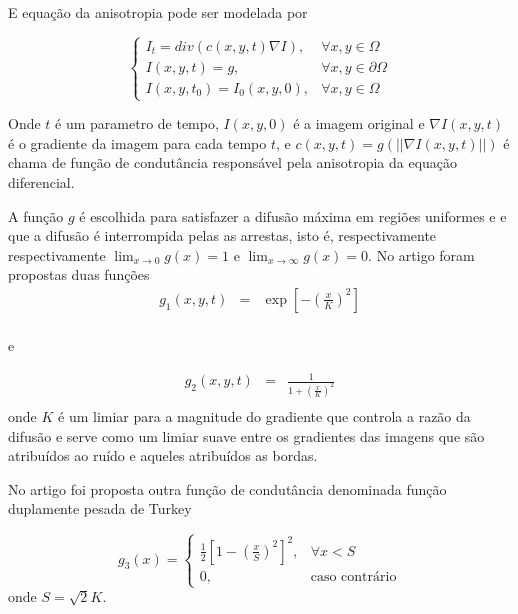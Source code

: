 \documentclass[a4paper]{article} %
\begin{document}
E equação da anisotropia pode ser modelada por 

\begin{equation}\label{eq2}
\left\{\begin{array}{lc}
I_t=div(c(x,y,t)\nabla I), & \forall x,y\in \Omega\\
I(x,y,t)=g, & \forall x,y\in\partial{\Omega}\\
I(x,y,t_0)=I_0(x,y,0), & \forall x,y\in \Omega
\end{array}
\right.
\end{equation}

Onde $t$ é um parametro de tempo, $I(x,y,0)$ é a imagem original e $\nabla I(x,y,t)$ é o gradiente da imagem para cada tempo $t$, e $c(x,y,t)=g(||\nabla I(x,y,t)||)$ é chama de função de condutância responsável pela anisotropia da equação diferencial.

A função $g$ é escolhida para satisfazer a difusão máxima em regiões uniformes e e que a difusão é interrompida pelas as arrestas, isto é, respectivamente respectivamente $\lim_{x\rightarrow 0}g(x)=1$ e $\lim_{x\rightarrow\infty}g(x)=0$. No artigo \cite{perona1990scale} foram propostas duas funções
\begin{equation}\label{eq3}
\begin{array}{lcl}
g_{1}(x,y,t)&=&\exp\left[-\left(\frac{x}{K}\right)^2\right]\\
\end{array}
\end{equation}

e 

\begin{equation}\label{eq4}
\begin{array}{lcl}
	g_{2}(x,y,t)&=&\frac{1}{1+\left(\frac{x}{K}\right)^2}\\
\end{array}
\end{equation}
onde $K$ é um limiar para a magnitude do gradiente que controla a razão da difusão e serve como um limiar suave entre os gradientes das imagens que são atribuídos ao ruído e aqueles atribuídos as bordas.

No artigo \cite{black1998robust} foi proposta outra função de condutância denominada função duplamente pesada de Turkey


\begin{equation}\label{eq5}
	g_{3}(x)=\left\{\begin{array}{lc}
		\frac{1}{2}\left[1-\left(\frac{x}{S}\right)^2\right]^2, & \forall x<S\\
		0, & \mbox{caso contrário}
\end{array}
\right.
\end{equation}
onde $S=\sqrt{2}K$.
\end{document}
